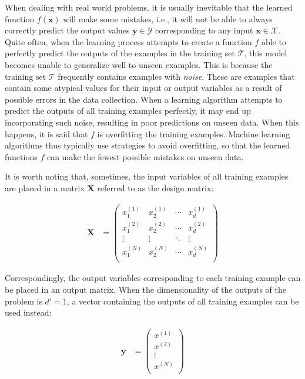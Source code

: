 When dealing with real world problems, it is usually inevitable that the learned function $f(\mathbf{x})$ will make some mistakes, i.e., it will not be able to always correctly predict the output values  $\mathbf{y} \in \mathcal{Y}$ corresponding to any input $\mathbf{x} \in \mathcal{X}$. Quite often, when the learning process attempts to create a function $f$ able to perfectly predict the outputs of the examples in the training set $\mathcal{T}$, this model becomes unable to generalize well to unseen examples. This is because the training set $\mathcal{T}$ frequently contains examples with \textit{noise}. These are examples that contain some atypical values for their input or output variables as a result of possible errors in the data collection. When a learning algorithm attempts to predict the outputs of all training examples perfectly, it may end up incorporating such noise, resulting in poor predictions on unseen data. When this happens, it is said that $f$ is overfitting the training examples. Machine learning algorithms thus typically use strategies to avoid overfitting, so that the learned functions $f$ can make the fewest possible mistakes on unseen data.  

It is worth noting that, sometimes, the input variables of all training examples are placed in a matrix $\mathbf{X}$ referred to as the design matrix:

\begin{align}
    \mathbf{X} &= \begin{pmatrix}
           x^{(1)}_{1} & x^{(1)}_{2} & \cdots & x^{(1)}_{d} \\
           x^{(2)}_{1} & x^{(2)}_{2} & \cdots & x^{(2)}_{d} \\
           \vdots & \vdots & \ddots & \vdots \\
		   x^{(N)}_{1} & x^{(N)}_{2} & \cdots & x^{(N)}_{d} \\
         \end{pmatrix}
  \end{align}

Correspondingly, the output variables corresponding to each training example can be placed in an output matrix. When the dimensionality of the outputs of the problem is $d'=1$, a vector containing the outputs of all training examples can be used instead:

\begin{align}
    \mathbf{y} &= \begin{pmatrix}
           x^{(1)} \\
           x^{(2)} \\
           \vdots \\
		   x^{(N)} \\
         \end{pmatrix}
  \end{align}

